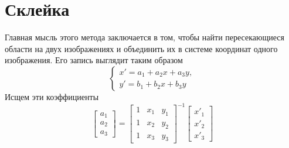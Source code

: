 \documentclass[a4paper,12pt]{article}
\begin{document}
\section{Склейка}
Главная мысль этого метода заключается в том, чтобы найти пересекающиеся области на двух изображениях и объединить их в системе координат одного изображения.
Его запись выглядит таким образом
$$
	\begin{cases}
		x'=a_1+a_2x+a_3y, \\
		y'=b_1+b_2x+b_3y
	\end{cases}
$$
Исщем эти коэффициенты 
$$
	\begin{bmatrix}
		a_1  \\ a_2 \\ a_3
	\end{bmatrix}
	=
	\begin{bmatrix}
		1 & x_1 & y_1
		\\ 1 & x_2 & y_2
		\\ 1 & x_3 & y_3
	\end{bmatrix}^{-1}
	\begin{bmatrix}
		x'_1  \\ x'_2 \\ x'_3
	\end{bmatrix}
$$
\end{document}

